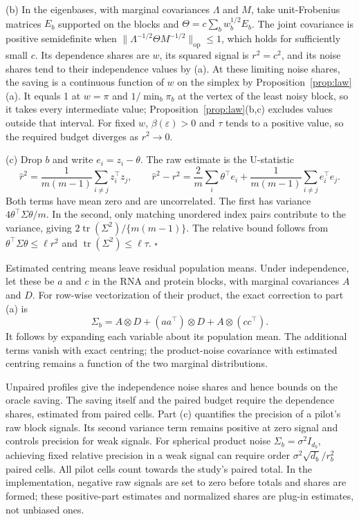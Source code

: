 (b) In the eigenbases, with marginal covariances $\Lambda$ and $M$, take unit-Frobenius matrices $E_b$ supported on the blocks and $\Theta=c\sum_bw_b^{1/2}E_b$. The joint covariance is positive semidefinite when $\|\Lambda^{-1/2}\Theta M^{-1/2}\|_{\mathrm{op}}\le1$, which holds for sufficiently small $c$. Its dependence shares are $w$, its squared signal is $r^2=c^2$, and its noise shares tend to their independence values by (a). At these limiting noise shares, the saving is a continuous function of $w$ on the simplex by Proposition~\ref{prop:law}(a). It equals 1 at $w=\pi$ and $1/\min_b\pi_b$ at the vertex of the least noisy block, so it takes every intermediate value; Proposition~\ref{prop:law}(b,c) excludes values outside that interval. For fixed $w$, $\beta(\varepsilon)>0$ and $\tau$ tends to a positive value, so the required budget diverges as $r^2\to0$.

(c) Drop $b$ and write $e_i=z_i-\theta$. The raw estimate is the U-statistic
\[
\widehat r^2=\frac{1}{m(m-1)}\sum_{i\ne j}z_i^\top z_j,
\qquad
\widehat r^2-r^2=\frac{2}{m}\sum_i\theta^\top e_i
+\frac{1}{m(m-1)}\sum_{i\ne j}e_i^\top e_j.
\]
Both terms have mean zero and are uncorrelated. The first has variance $4\theta^\top\Sigma\theta/m$. In the second, only matching unordered index pairs contribute to the variance, giving $2\operatorname{tr}(\Sigma^2)/\{m(m-1)\}$. The relative bound follows from $\theta^\top\Sigma\theta\le\ell r^2$ and $\operatorname{tr}(\Sigma^2)\le\ell\tau$. $\square$

Estimated centring means leave residual population means. Under independence, let these be $a$ and $c$ in the RNA and protein blocks, with marginal covariances $A$ and $D$. For row-wise vectorization of their product, the exact correction to part (a) is
\[
\Sigma_b=A\otimes D+(aa^\top)\otimes D+A\otimes(cc^\top).
\]
It follows by expanding each variable about its population mean. The additional terms vanish with exact centring; the product-noise covariance with estimated centring remains a function of the two marginal distributions.

Unpaired profiles give the independence noise shares and hence bounds on the oracle saving. The saving itself and the paired budget require the dependence shares, estimated from paired cells. Part (c) quantifies the precision of a pilot's raw block signals. Its second variance term remains positive at zero signal and controls precision for weak signals. For spherical product noise $\Sigma_b=\sigma^2 I_{d_b}$, achieving fixed relative precision in a weak signal can require order $\sigma^2\sqrt{d_b}/r_b^2$ paired cells. All pilot cells count towards the study's paired total. In the implementation, negative raw signals are set to zero before totals and shares are formed; these positive-part estimates and normalized shares are plug-in estimates, not unbiased ones.

